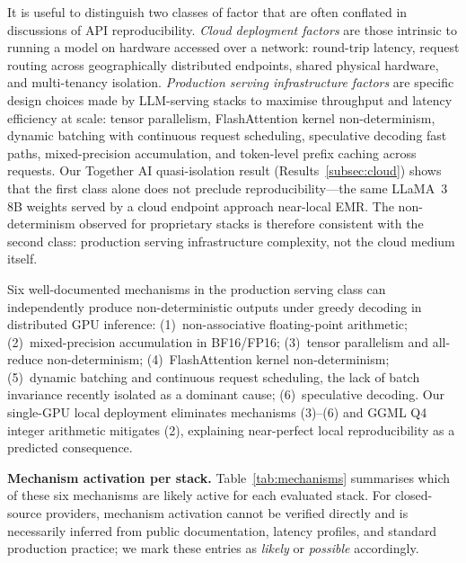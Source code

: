 \documentclass[sn-nature]{sn-jnl}
\begin{document}
It is useful to distinguish two classes of factor that are often conflated in discussions of API reproducibility.
\emph{Cloud deployment factors} are those intrinsic to running a model on hardware accessed over a network: round-trip latency, request routing across geographically distributed endpoints, shared physical hardware, and multi-tenancy isolation.
\emph{Production serving infrastructure factors} are specific design choices made by LLM-serving stacks to maximise throughput and latency efficiency at scale: tensor parallelism, FlashAttention kernel non-determinism, dynamic batching with continuous request scheduling, speculative decoding fast paths, mixed-precision accumulation, and token-level prefix caching across requests.
Our Together AI quasi-isolation result (Results~\ref{subsec:cloud}) shows that the first class alone does not preclude reproducibility---the same LLaMA~3 8B weights served by a cloud endpoint approach near-local EMR.
The non-determinism observed for proprietary stacks is therefore consistent with the second class: production serving infrastructure complexity, not the cloud medium itself.

Six well-documented mechanisms in the production serving class can independently produce non-deterministic outputs under greedy decoding in distributed GPU inference:
(1)~non-associative floating-point arithmetic\cite{higham2002accuracy};
(2)~mixed-precision accumulation in BF16/FP16\cite{yuan2025nondeterminism};
(3)~tensor parallelism and all-reduce non-determinism\cite{shoeybi2019megatron};
(4)~FlashAttention kernel non-determinism\cite{dao2022flashattention};
(5)~dynamic batching and continuous request scheduling, the lack of batch invariance recently isolated as a dominant cause\cite{kwon2023vllm,he2025nondeterminism};
(6)~speculative decoding\cite{leviathan2023speculative}.
Our single-GPU local deployment eliminates mechanisms (3)--(6) and GGML Q4 integer arithmetic mitigates (2), explaining near-perfect local reproducibility as a predicted consequence.

\textbf{Mechanism activation per stack.}
Table~\ref{tab:mechanisms} summarises which of these six mechanisms are likely active for each evaluated stack.
For closed-source providers, mechanism activation cannot be verified directly and is necessarily inferred from public documentation, latency profiles, and standard production practice; we mark these entries as \emph{likely} or \emph{possible} accordingly.
\end{document}
